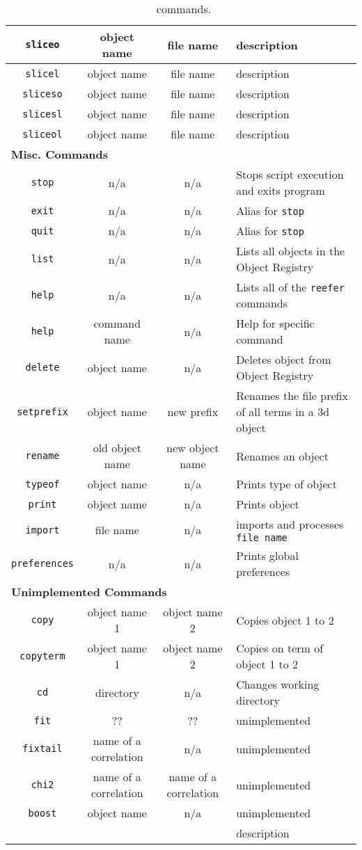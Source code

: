 \begin{table*}
\begin{tabular}{|c|c|c|l|}
    {\tt sliceo} & object name & file name & description\\ \hline
    {\tt slicel} & object name & file name & description\\ \hline
    {\tt sliceso} & object name & file name & description\\ \hline
    {\tt slicesl} & object name & file name & description\\ \hline
    {\tt sliceol} & object name & file name & description\\ \hline
    \multicolumn{4}{|l|}{\bf Misc. Commands}\\ \hline
    {\tt stop} & n/a & n/a & Stops script execution and exits program\\ \hline
    {\tt exit} & n/a & n/a & Alias for {\tt stop}\\ \hline
    {\tt quit} & n/a & n/a & Alias for {\tt stop}\\ \hline
    {\tt list} & n/a & n/a & Lists all objects in the Object Registry\\ \hline
    {\tt help} & n/a & n/a & Lists all of the {\tt reefer} commands\\ \hline
    {\tt help} & command name & n/a & Help for specific command\\ \hline
    {\tt delete} & object name & n/a & Deletes object from Object Registry\\ \hline
    {\tt setprefix} & object name  & new prefix & Renames the file prefix of all terms in a 3d object\\ \hline
    {\tt rename} & old object name & new object name  & Renames an object\\ \hline
    {\tt typeof} & object name & n/a  & Prints type of object\\ \hline
    {\tt print} & object name & n/a  & Prints object\\ \hline
    {\tt import} & file name & n/a & imports and processes {\tt file name} \\ \hline
    {\tt preferences} & n/a & n/a  & Prints global preferences\\ \hline
    \multicolumn{4}{|l|}{\bf Unimplemented Commands}\\ \hline
    {\tt copy} & object name 1 & object name 2 & Copies object 1 to 2\\ \hline
    {\tt copyterm} & object name 1 & object name 2 & Copies on term of object 1 to 2\\ \hline
    {\tt cd} & directory & n/a  & Changes working directory\\ \hline
    {\tt fit} & ?? & ?? & unimplemented\\ \hline
    {\tt fixtail} & name of a correlation & n/a & unimplemented\\ \hline
    {\tt chi2} & name of a correlation & name of a correlation & unimplemented\\ \hline
    {\tt boost} & object name & n/a & unimplemented\\ \hline
    {\tt } &  &  & description\\ \hline\hline
\end{tabular}
\caption{\reefer\, commands.}
\label{commands}
\end{table*}

